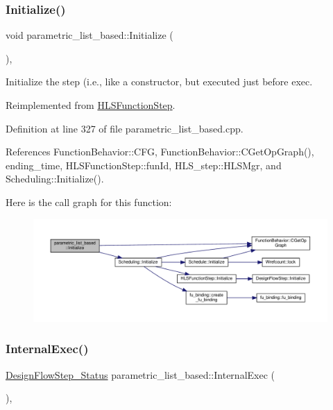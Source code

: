 \subsubsection{\texorpdfstring{Initialize()}{Initialize()}}
{\footnotesize\ttfamily void parametric\+\_\+list\+\_\+based\+::\+Initialize (\begin{DoxyParamCaption}{ }\end{DoxyParamCaption})\hspace{0.3cm}{\ttfamily [override]}, {\ttfamily [virtual]}}



Initialize the step (i.\+e., like a constructor, but executed just before exec. 



Reimplemented from \hyperlink{classHLSFunctionStep_a966629ba62a8188ff4fa783ab0d4e319}{H\+L\+S\+Function\+Step}.



Definition at line 327 of file parametric\+\_\+list\+\_\+based.\+cpp.



References Function\+Behavior\+::\+C\+FG, Function\+Behavior\+::\+C\+Get\+Op\+Graph(), ending\+\_\+time, H\+L\+S\+Function\+Step\+::fun\+Id, H\+L\+S\+\_\+step\+::\+H\+L\+S\+Mgr, and Scheduling\+::\+Initialize().

Here is the call graph for this function\+:
\nopagebreak
\begin{figure}[H]
\begin{center}
\leavevmode
\includegraphics[width=350pt]{d7/d47/classparametric__list__based_a33b5a6aadaf0f36b342b434126ebbf79_cgraph}
\end{center}
\end{figure}
\mbox{\label{classparametric__list__based_a15e5fa8f17cfb775d16ab6d541c7822a}} 
\subsubsection{\texorpdfstring{Internal\+Exec()}{InternalExec()}}
{\footnotesize\ttfamily \hyperlink{design__flow__step_8hpp_afb1f0d73069c26076b8d31dbc8ebecdf}{Design\+Flow\+Step\+\_\+\+Status} parametric\+\_\+list\+\_\+based\+::\+Internal\+Exec (\begin{DoxyParamCaption}{ }\end{DoxyParamCaption})\hspace{0.3cm}{\ttfamily [override]}, {\ttfamily [virtual]}}




